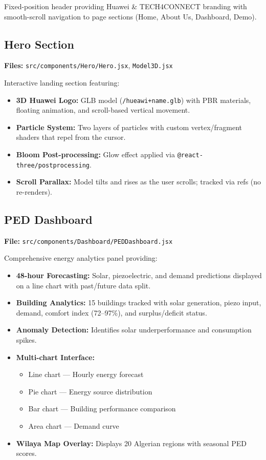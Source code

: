 \documentclass[12pt,a4paper]{article}
\begin{document}
Fixed-position header providing Huawei \& TECH4CONNECT branding with smooth-scroll navigation to page sections (Home, About Us, Dashboard, Demo).

\subsection{Hero Section}
\textbf{Files:} \texttt{src/components/Hero/Hero.jsx}, \texttt{Model3D.jsx}

Interactive landing section featuring:
\begin{itemize}
    \item \textbf{3D Huawei Logo:} GLB model (\texttt{/hueawi+name.glb}) with PBR materials, floating animation, and scroll-based vertical movement.
    \item \textbf{Particle System:} Two layers of particles with custom vertex/fragment shaders that repel from the cursor.
    \item \textbf{Bloom Post-processing:} Glow effect applied via \texttt{@react-three/postprocessing}.
    \item \textbf{Scroll Parallax:} Model tilts and rises as the user scrolls; tracked via refs (no re-renders).
\end{itemize}

\subsection{PED Dashboard}
\textbf{File:} \texttt{src/components/Dashboard/PEDDashboard.jsx}

Comprehensive energy analytics panel providing:
\begin{itemize}
    \item \textbf{48-hour Forecasting:} Solar, piezoelectric, and demand predictions displayed on a line chart with past/future data split.
    \item \textbf{Building Analytics:} 15 buildings tracked with solar generation, piezo input, demand, comfort index (72--97\%), and surplus/deficit status.
    \item \textbf{Anomaly Detection:} Identifies solar underperformance and consumption spikes.
    \item \textbf{Multi-chart Interface:}
    \begin{itemize}
        \item Line chart --- Hourly energy forecast
        \item Pie chart --- Energy source distribution
        \item Bar chart --- Building performance comparison
        \item Area chart --- Demand curve
    \end{itemize}
    \item \textbf{Wilaya Map Overlay:} Displays 20 Algerian regions with seasonal PED scores.
\end{itemize}
\end{document}
